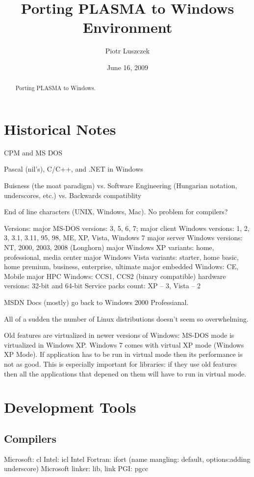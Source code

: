 \documentclass[letterpaper]{article}
\newcommand\ilc[1]{\textsf{#1}}
\newcommand\Win{Windows\texttrademark\xspace}
\begin{document}
\title{Porting PLASMA to Windows Environment}
\author{Piotr Luszczek}
\date{June 16, 2009}
\maketitle

\begin{abstract}
Porting PLASMA to \Win.
\end{abstract}

\section{Historical Notes}
CPM and MS DOS

Pascal (nil's), C/C++, and .NET in Windows

Buisness (the moat paradigm) vs. Software Engineering (Hungarian notation, underscores, etc.)
vs. Backwards compatiblity

End of line characters (UNIX, Windows, Mac). No problem for compilers?

Versions: major MS-DOS versions: 3, 5, 6, 7;
major client Windows versions: 1, 2, 3, 3.1, 3.11, 95, 98, ME, XP, Vista, Windows 7
major server Windows versions: NT, 2000, 2003, 2008 (Longhorn)
major Windows XP variants: home, professional, media center
major Windows Vista variants: starter, home basic, home premium, business, enterprise, ultimate
major embedded Windows: CE, Mobile
major HPC Windows: CCS1, CCS2 (binary compatible)
hardware versions: 32-bit and 64-bit
Service packs count: XP -- 3, Vista -- 2

MSDN Docs (mostly) go back to Windows 2000 Professianal.

All of a sudden the number of Linux distributions doesn't seem so overwhelming.

Old features are virtualized in newer versions of Windows: MS-DOS mode is virtualized
in Windows XP. Windows 7 comes with virtual XP mode (Windows XP Mode). If application
has to be run in virtual mode then its performance is not as good. This is especially
important for libraries: if they use old features then all the applications that
depened on them will have to run in virtual mode.

\section{Development Tools}

\subsection{Compilers}
Microsoft: \ilc{cl}
Intel: \ilc{icl}
Intel Fortran: \ilc{ifort} (name mangling: default, options:adding underscore)
Microsoft linker: lib, link
PGI: pgcc
\end{document}
